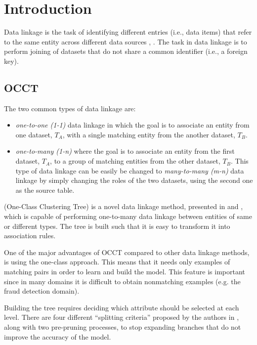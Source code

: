 \documentclass[a4paper,12pt]{article}
\newcommand{\newpar}{\smallskip\noindent} %
\begin{document}
\section{Introduction}
\begin{spacing}{1.5}
Data linkage is the task of identifying different entries (i.e., data items) that refer to the same entity across different data sources \cite{damaging2011}, \cite{kamra2008detecting}. The task in data linkage is to perform joining of datasets that do not share a common identifier (i.e., a foreign key).

\subsection{OCCT}
The two common types of data linkage are:
\begin{itemize}
  \item {\em one-to-one (1-1)} data linkage in which the goal is to associate an entity from one dataset, $T_{A}$, with a single matching entity from the another dataset, $T_{B}$.
  \item {\em one-to-many (1-n)} where the goal is to associate an entity from the first dataset, $T_{A}$, to a group of matching entities from the other dataset, $T_{B}$. This type of data linkage can be easily be changed to {\em many-to-many (m-n)} data linkage by simply changing the roles of the two datasets, using the second one as the source table.
\end{itemize}

\newpar{OCCT} (One-Class Clustering Tree) is a novel data linkage method, presented in \cite{dror2011thesis} and \cite{dror2014occt},
which is capable of performing one-to-many data linkage between entities of same or different types. The tree is built such that it is easy to transform it into association rules.

One of the major advantages of OCCT compared to other data linkage methods, is using the one-class approach. This means that it needs only examples of matching pairs in order to learn and build the model. This feature is important since in many domains it is difficult to obtain nonmatching examples (e.g. the fraud detection domain).

Building the tree requires deciding which attribute should be selected at each level. There are four different “splitting criteria” proposed by the authors in \cite{dror2014occt}, along with two pre-pruning processes, to stop expanding branches that do not improve the accuracy of the model.


\end{spacing}
\end{document}
